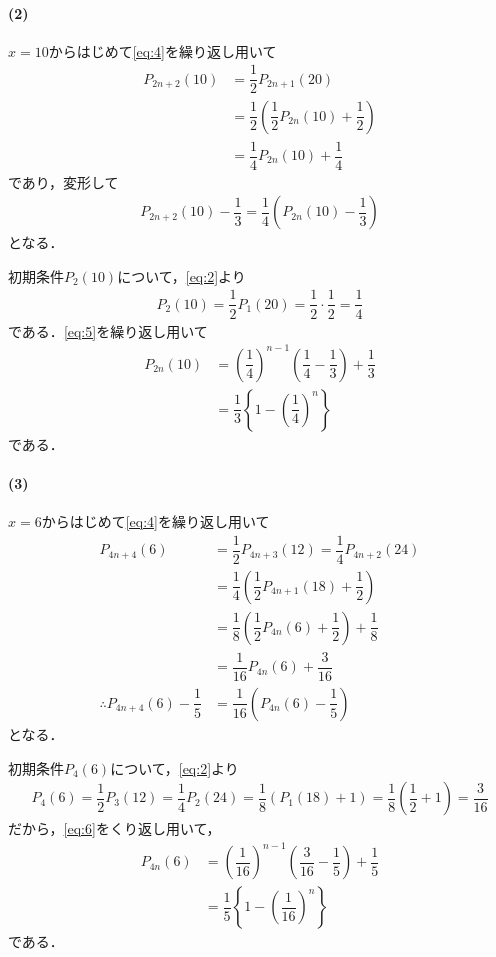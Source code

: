 \documentclass[../../main.tex]{subfiles}
\begin{document}
\paragraph{(2)}

$x=10$からはじめて\cref{eq:4}を繰り返し用いて
\begin{align}
  P_{2n+2}(10)
  &= \dfrac{1}{2} P_{2n+1}(20) \\
  &= \dfrac{1}{2}\left(\dfrac{1}{2} P_{2n}(10) + \dfrac{1}{2}\right) \\
  &= \dfrac{1}{4} P_{2n}(10) + \dfrac{1}{4}
\end{align}
であり，変形して
\begin{align}
  P_{2n+2}(10) - \dfrac{1}{3} = \dfrac{1}{4} \left(P_{2n}(10) - \dfrac{1}{3}\right) \label{eq:5}
\end{align}
となる．

初期条件$P_2(10)$について，\cref{eq:2}より
\begin{align}
  P_2(10) = \dfrac{1}{2}P_1(20) = \dfrac{1}{2}\cdot\dfrac{1}{2}=\dfrac{1}{4}
\end{align}
である．\cref{eq:5}を繰り返し用いて
\begin{align}
  P_{2n}(10)
  &= \left(\dfrac{1}{4}\right)^{n-1} \left(\dfrac{1}{4} - \dfrac{1}{3}\right) + \dfrac{1}{3} \\
  &= \dfrac{1}{3} \left\{ 1 - \left(\dfrac{1}{4}\right)^n \right\}
\end{align}
である．

\paragraph{(3)}

$x=6$からはじめて\cref{eq:4}を繰り返し用いて
\begin{align}
  P_{4n+4}(6)
  &= \dfrac{1}{2} P_{4n+3}(12) = \dfrac{1}{4} P_{4n+2}(24) \\
  &= \dfrac{1}{4}\left(\dfrac{1}{2} P_{4n+1}(18) + \dfrac{1}{2}\right) \\
  &= \dfrac{1}{8} \left(\dfrac{1}{2} P_{4n}(6) + \dfrac{1}{2}\right) + \dfrac{1}{8} \\
  &= \dfrac{1}{16} P_{4n}(6) + \dfrac{3}{16} \\
  \therefore
  P_{4n+4}(6) - \dfrac{1}{5}
  &= \dfrac{1}{16} \left(P_{4n}(6) - \dfrac{1}{5}\right) \label{eq:6}
\end{align}
となる．

初期条件$P_4(6)$について，\cref{eq:2}より
\begin{align}
  P_4(6)
  = \dfrac{1}{2}P_3(12)
  = \dfrac{1}{4}P_2(24)
  = \dfrac{1}{8}\left(P_1(18)+1\right)
  = \dfrac{1}{8}\left(\dfrac{1}{2}+1\right)
  = \dfrac{3}{16}
\end{align}
だから，\cref{eq:6}をくり返し用いて，
\begin{align}
  P_{4n}(6)
  &= \left(\dfrac{1}{16}\right)^{n-1} \left(\dfrac{3}{16} - \dfrac{1}{5}\right) + \dfrac{1}{5} \\
  &= \dfrac{1}{5} \left\{ 1 - \left(\dfrac{1}{16}\right)^n \right\}
\end{align}
である．
\end{document}
